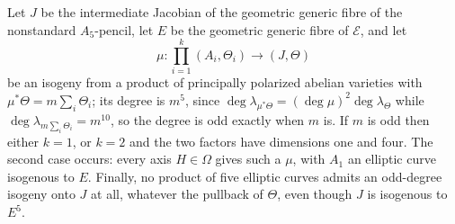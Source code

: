 \begin{proposition}
\label{prop:no-elliptic-product}
%
%
%
Let \(J\) be the intermediate Jacobian of the geometric generic fibre of the
nonstandard \(A_5\)-pencil, let \(E\) be the geometric generic fibre of
\(\mathcal E\), and let
\[
 \mu:\prod_{i=1}^{k}(A_i,\Theta_i)\longrightarrow(J,\Theta)
\]
be an isogeny from a product of principally polarized abelian varieties with
\(\mu^*\Theta=m\sum_i\Theta_i\); its degree is \(m^5\), since
\(\deg\lambda_{\mu^*\Theta}=(\deg\mu)^2\deg\lambda_\Theta\) while
\(\deg\lambda_{m\sum_i\Theta_i}=m^{10}\), so the degree is odd exactly when
\(m\) is.  If \(m\) is odd then either \(k=1\), or \(k=2\) and the two
factors have dimensions one and four.  The second case occurs: every axis
\(H\in\Omega\) gives such a \(\mu\), with \(A_1\) an elliptic curve
isogenous to \(E\).  Finally, no product of five elliptic curves admits an
odd-degree isogeny onto \(J\) at all, whatever the pullback of \(\Theta\),
even though \(J\) is isogenous to \(E^5\).
\end{proposition}

